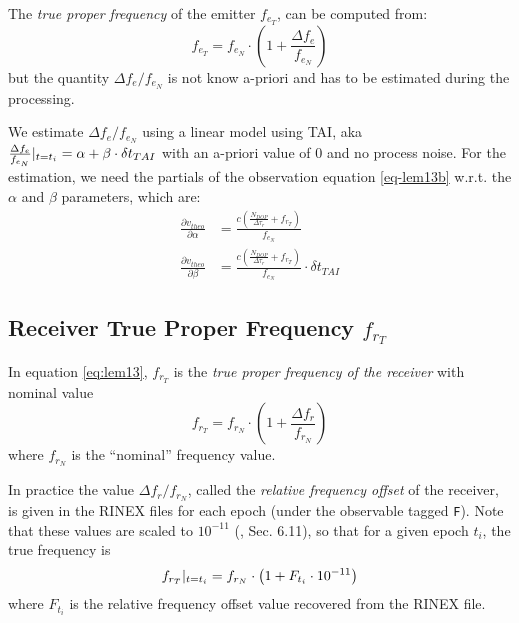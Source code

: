 The \emph{true proper frequency} of the emitter $f_{e_T}$, can be computed 
from:
\begin{equation}
  f_{e_T} = f_{e_N} \cdot \left( 1 + \frac{\Delta f_e}{f_{e_N}} \right)
\end{equation}
but the quantity $\Delta f_e / f_{e_N}$ is not know a-priori and has to be 
estimated during the processing.

We estimate $\Delta f_e / f_{e_N}$ using a \colorbox{blue!20}{linear model using TAI}, 
aka $\frac{\Delta f_e}{f_{e_N}}|_{t=t_i} = \alpha + \beta \cdot \delta t_{TAI}$
with an a-priori value of 0 and no process noise. For the estimation, we need 
the partials of the observation equation \ref{eq-lem13b} w.r.t. the $\alpha$ and 
$\beta$ parameters, which are:
\begin{equation}
  \begin{aligned}
  \frac{\partial v_{theo}}{\partial \alpha} &= 
    \frac{c(\frac{N_{DOP}}{\Delta\tau_r} + f_{r_T})}{f_{e_N}} \\
  \frac{\partial v_{theo}}{\partial \beta} &= 
    \frac{c(\frac{N_{DOP}}{\Delta\tau_r} + f_{r_T})}{f_{e_N}} \cdot \delta t_{TAI}
  \end{aligned}
\end{equation}

\subsection{Receiver True Proper Frequency $f_{r_T}$}
\label{ssec:receiver-true-proper-frequency}
In equation \ref{eq:lem13}, $f_{r_T}$ is the \emph{true proper frequency of 
the receiver} with nominal value 
\begin{equation}
  f_{r_T} = f_{r_N} \cdot \left( 1 + \frac{\Delta f_r}{f_{r_N}} \right)
\end{equation}
where $f_{r_N}$ is the ``nominal'' frequency value.

In practice the value $\Delta f_r / f_{r_N}$, called the \emph{relative 
frequency offset} of the receiver, is given in the RINEX files for each epoch 
(under the observable tagged \texttt{F}). Note that these values are scaled to 
$10^{-11}$ (\cite{DORISRNX3}, Sec. 6.11), so that for a given epoch $t_i$, the 
true frequency is
\begin{equation}
  f_{r_T}|_{t=t_i} = f_{r_N} \cdot \left( 1 + F_{t_i} \cdot 10^{-11} \right)
  \label{eq:tpf-rec}
\end{equation}
where $F_{t_i}$ is the relative frequency offset value recovered from the RINEX 
file.

